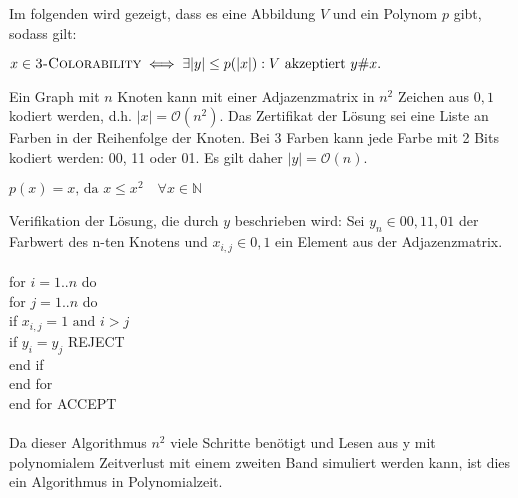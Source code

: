 Im folgenden wird gezeigt, dass es eine Abbildung $V$ und ein Polynom $p$ gibt, sodass gilt:

\begin{center}
$x \in \textsc{3-Colorability} \iff \exists |y| \leq p(|x|): V \text{ akzeptiert } y\#x.$
\end{center}

Ein Graph mit $n$ Knoten kann mit einer Adjazenzmatrix in $n^2$ Zeichen aus ${0, 1}$ kodiert werden, d.h. $|x|=\mathcal{O}(n^2)$. Das Zertifikat der Lösung sei eine Liste an Farben in der Reihenfolge der Knoten. Bei 3 Farben kann jede Farbe mit 2 Bits kodiert werden: 00, 11 oder 01. Es gilt daher $|y|=\mathcal{O}(n)$.

\begin{center}
$p(x) = x \text{, da } x \leq x^2 \quad \forall x \in \mathbb{N}$
\end{center}

Verifikation der Lösung, die durch $y$ beschrieben wird:
Sei $y_n \in {00, 11, 01}$ der Farbwert des n-ten Knotens und $x_{i, j} \in {0, 1}$ ein Element aus der Adjazenzmatrix.
\\ \ \\
for $i=1..n$ do\\
\quad for $j=1..n$ do\\
\quad \quad if $x_{i, j} = 1 \text{ and } i > j$\\
\quad \quad \quad if $y_i = y_j$ REJECT\\
\quad \quad end if\\
\quad end for\\
end for
ACCEPT
\\ \ \\
Da dieser Algorithmus $n^2$ viele Schritte benötigt und Lesen aus y mit polynomialem Zeitverlust mit einem zweiten Band simuliert werden kann, ist dies ein Algorithmus in Polynomialzeit.